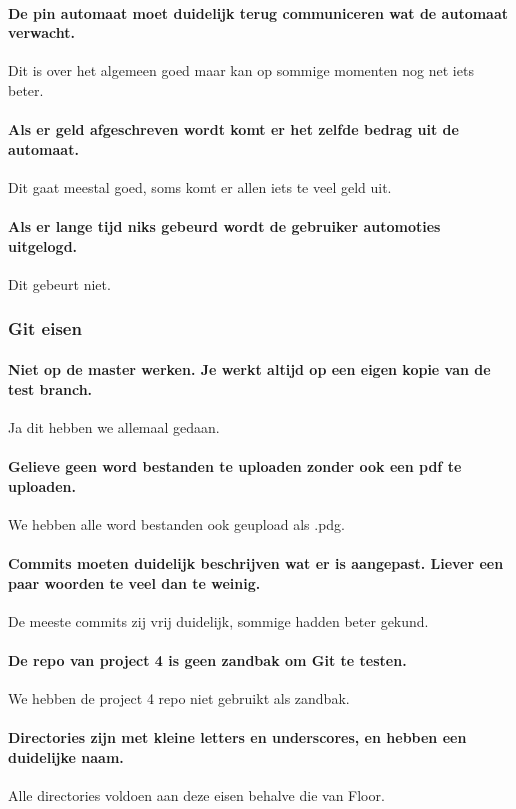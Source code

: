 \documentclass{article}
\begin{document}
\paragraph{De pin automaat moet duidelijk terug communiceren wat de automaat verwacht.}
Dit is over het algemeen goed maar kan op sommige momenten nog net iets beter.

\paragraph{Als er geld afgeschreven wordt komt er het zelfde bedrag uit de automaat.}
Dit gaat meestal goed, soms komt er allen iets te veel geld uit.

\paragraph{Als er lange tijd niks gebeurd wordt de gebruiker automoties uitgelogd.}
Dit gebeurt niet.

\subsubsection{Git eisen}
\paragraph{Niet op de master werken. Je werkt altijd op een eigen kopie van de test branch.}
Ja dit hebben we allemaal gedaan.

\paragraph{Gelieve geen word bestanden te uploaden zonder ook een pdf te uploaden.}
We hebben alle word bestanden ook geupload als .pdg.

\paragraph{Commits moeten duidelijk beschrijven wat er is aangepast. Liever een paar woorden te veel dan te weinig.}
De meeste commits zij vrij duidelijk, sommige hadden beter gekund.

\paragraph{De repo van project 4 is geen zandbak om Git te testen.}
We hebben de project 4 repo niet gebruikt als zandbak.
\paragraph{Directories zijn met kleine letters en underscores, en hebben een duidelijke naam.}
Alle directories voldoen aan deze eisen behalve die van Floor.
\end{document}
